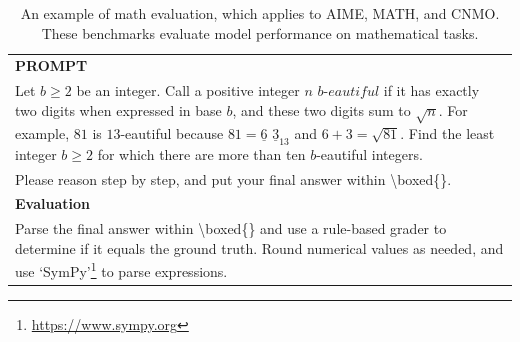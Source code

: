 
\begin{table}[h]
    \centering \small
        \caption{An example of math evaluation, which applies to AIME, MATH, and CNMO. These benchmarks evaluate model performance on mathematical tasks. } 
    \label{tab:math_eval_format_example}
    \begin{tabular}{p{}}
    \hline
    \textbf{PROMPT}\\
    Let $b \geq 2$ be an integer. Call a positive integer $n$ $b\textit{-eautiful}$ if it has exactly two digits when expressed in base $b$, and these two digits sum to $\sqrt{n}$. For example, $81$ is $13$-eautiful because $81=\underline{6}$ $\underline{3}_{13}$ and $6+3=\sqrt{81}$. Find the least integer $b\geq 2$ for which there are more than ten $b$-eautiful integers. \\
    Please reason step by step, and put your final answer within \textbackslash boxed\{\}. \\
    \hline
  \textbf{Evaluation}\\
  
  Parse the final answer within \textbackslash boxed\{\} and use a rule-based grader to determine if it equals the ground truth. Round numerical values as needed, and use `SymPy'\footnote{\url{https://www.sympy.org}} to parse expressions. \\
      \hline
    \end{tabular}
\end{table}